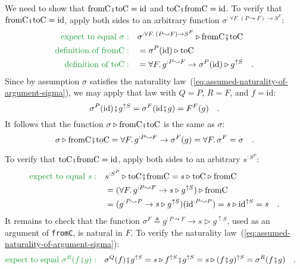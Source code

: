 We need to show that $\text{fromC}\bef\text{toC}=\text{id}$ and $\text{toC}\bef\text{fromC}=\text{id}$.
To verify that $\text{fromC}\bef\text{toC}=\text{id}$, apply both
sides to an arbitrary function $\sigma^{:\forall F.\,(P\leadsto F)\rightarrow S^{F}}$:
\begin{align*}
{\color{greenunder}\text{expect to equal }\sigma:}\quad & \sigma^{:\forall F.\,(P\leadsto F)\rightarrow S^{F}}\triangleright\text{fromC}\bef\text{toC}\\
{\color{greenunder}\text{definition of }\text{fromC}:}\quad & =\sigma^{P}(\text{id})\triangleright\text{toC}\\
{\color{greenunder}\text{definition of }\text{toC}:}\quad & =\forall F.\,g^{:P\leadsto F}\rightarrow\sigma^{P}(\text{id})\triangleright g^{\uparrow S}\quad.
\end{align*}
Since by assumption $\sigma$ satisfies the naturality law~(\ref{eq:assumed-naturality-of-argument-sigma}),
we may apply that law with $Q=P$, $R=F$, and $f=\text{id}$:
\[
\sigma^{P}(\text{id})\bef g^{\uparrow S}=\sigma^{F}(\text{id}\bef g)=F^{F}(g)\quad.
\]
It follows that the function $\sigma\triangleright\text{fromC}\bef\text{toC}$
is the same as $\sigma$:
\[
\sigma\triangleright\text{fromC}\bef\text{toC}=\forall F.\,g^{:P\leadsto F}\rightarrow\sigma^{F}(g)=\forall F.\,\sigma^{F}=\sigma\quad.
\]

To verify that $\text{toC}\bef\text{fromC}=\text{id}$, apply both
sides to an arbitrary $s^{:S^{P}}$:
\begin{align*}
{\color{greenunder}\text{expect to equal }s:}\quad & s^{:S^{P}}\triangleright\text{toC}\bef\text{fromC}=s\triangleright\text{toC}\triangleright\text{fromC}\\
 & =(\forall F.\,g^{:P\leadsto F}\rightarrow s\triangleright g^{\uparrow S})\triangleright\text{fromC}\\
 & =(g^{:P\leadsto P}\rightarrow s\triangleright g^{\uparrow S})(\text{id}^{:P\leadsto P})=s\triangleright\text{id}^{\uparrow S}=s\quad.
\end{align*}
It remains to check that the function $\sigma^{F}\triangleq g^{:P\leadsto F}\rightarrow s\triangleright g^{\uparrow S}$,
used as an argument of \lstinline!fromC!, is natural in $F$. To
verify the naturality law~(\ref{eq:assumed-naturality-of-argument-sigma}):
\begin{align*}
{\color{greenunder}\text{expect to equal }\sigma^{R}(f\bef g):}\quad & \sigma^{Q}(f)\bef g^{\uparrow S}=s\triangleright f^{\uparrow S}\bef g^{\uparrow S}=s\triangleright(f\bef g)^{\uparrow S}=\sigma^{R}(f\bef g)\quad.
\end{align*}

